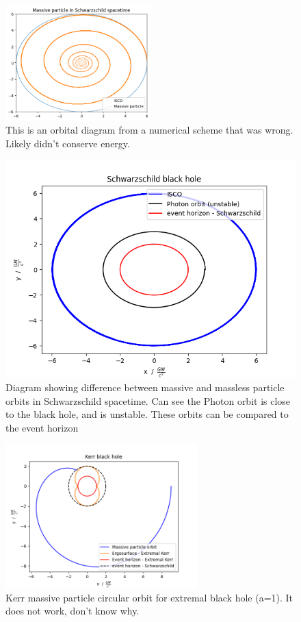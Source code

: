 \begin{figure}
    \centering
    \includegraphics[width=0.5\textwidth]{orbits_images/shitty_orbit_program.png}
    \caption{This is an orbital diagram from a numerical scheme that was wrong. Likely didn't conserve energy.}
    \label{fig:terrible orbit program}
\end{figure}


\begin{figure}
    \centering
    \includegraphics[width=0.66
\textwidth]{orbits_images/schwarzschild_orbits.png}
    \caption{Diagram showing difference between massive and massless particle orbits in Schwarzschild spacetime. Can see the Photon orbit is close to the black hole, and is unstable. These orbits can be compared to the event horizon}
    \label{fig:Scwarzschild orbits}
\end{figure}

\begin{figure}
    \centering
    \includegraphics[width=0.66\textwidth]{orbits_images/Kerr_orbits.png}
    \caption{Kerr massive particle circular orbit for extremal black hole (a=1). It does not work, don't know why.}
    \label{fig:Kerr massive particle orbit}
\end{figure}



